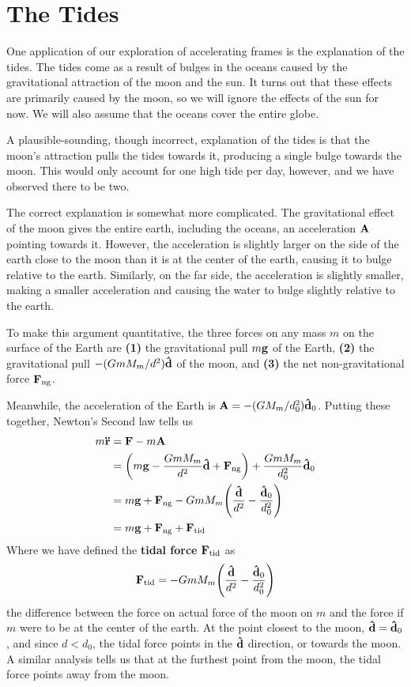 \section{The Tides}
One application of our exploration of accelerating frames is the explanation of the tides. The tides come as a result of bulges in the oceans caused by the gravitational attraction of the moon and the sun. It turns out that these effects are primarily caused by the moon, so we will ignore the effects of the sun for now. We will also assume that the oceans cover the entire globe.

A plausible-sounding, though incorrect, explanation of the tides is that the moon's attraction pulls the tides towards it, producing a single bulge towards the moon. This would only account for one high tide per day, however, and we have observed there to be two.

The correct explanation is somewhat more complicated. The gravitational effect of the moon gives the entire earth, including the oceans, an acceleration $\mathbf{A}$ pointing towards it. However, the acceleration is slightly larger on the side of the earth close to the moon than it is at the center of the earth, causing it to bulge relative to the earth. Similarly, on the far side, the acceleration is slightly smaller, making a smaller acceleration and causing the water to bulge slightly relative to the earth.

To make this argument quantitative, the three forces on any mass $m$ on the surface of the Earth are \textbf{(1)} the gravitational pull $m\mathbf{g}$ of the Earth, \textbf{(2)} the gravitational pull $-(GmM_m/d^2)\mathbf{\hat d}$ of the moon, and \textbf{(3)} the net non-gravitational force $\mathbf{F}_\text{ng}$.

Meanwhile, the acceleration of the Earth is $\mathbf{A} = -(GM_m/d_0^2)\mathbf{\hat d}_0$. Putting these together, Newton's Second law tells us
\begin{align*}
     m\mbf{\ddot r} &= \mbf F - m\mbf A \\
     &= \pqty{m\mbf g - \frac{GmM_m}{d^2}\mbf{\hat d} + \mbf{F}_\text{ng}} + \frac{GmM_m}{d_0^2}\mbf{\hat d}_0 \\
     &= m\mbf g + \mbf F_\text{ng} - GmM_m\pqty{\frac{\mbf{\hat d}}{d^2}-\frac{\mbf{\hat d}_0}{d_0^2}} \\
     &= m\mbf g + \mbf F_\text{ng} + \mbf F_\text{tid}
\end{align*}
Where we have defined the \textbf{tidal force} $\mathbf{F}_\text{tid}$ as 
\[ \mbf F_\text{tid} = - GmM_m\pqty{\frac{\mbf{\hat d}}{d^2}-\frac{\mbf{\hat d}_0}{d_0^2}} \]
the difference between the force on actual force of the moon on $m$ and the force if $m$ were to be at the center of the earth. At the point closest to the moon, $\mathbf{\hat d} = \mathbf{\hat d}_0$, and since $d < d_0$, the tidal force points in the $\mathbf{\hat d}$ direction, or towards the moon. A similar analysis tells us that at the furthest point from the moon, the tidal force points away from the moon. 

